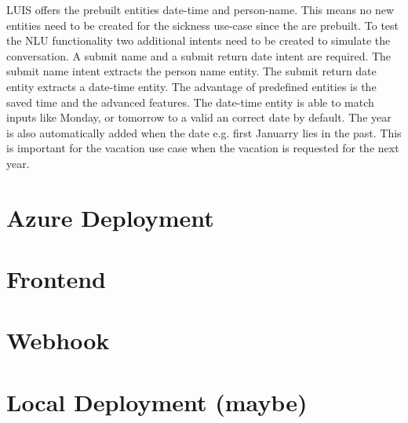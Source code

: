 LUIS offers the prebuilt entities date-time and person-name.
This means no new entities need to be created for the sickness use-case
since the are prebuilt.
To test the NLU functionality two additional intents need to be created to 
simulate the conversation.
A submit name and a submit return date intent are required.
The submit name intent extracts the person name entity.
The submit return date entity extracts a date-time entity.
The advantage of predefined entities is the saved time and the 
advanced features.
The date-time entity is able to match inputs like Monday, or tomorrow to 
a valid an correct date by default.
The year is also automatically added when the date e.g. first Januarry lies in the past.
This is important for the vacation use case when the vacation is requested for 
the next year. 





\section{Azure Deployment}
\section{Frontend}
\section{Webhook}
\section{Local Deployment (maybe)}